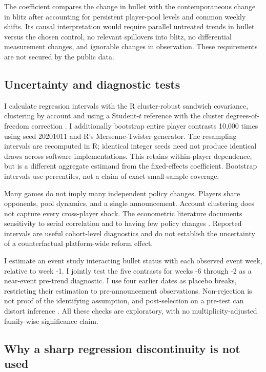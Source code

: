 \documentclass[11pt,a4paper]{article}
\begin{document}
The coefficient compares the change in bullet with the contemporaneous change in blitz after accounting for persistent player-pool levels and common weekly shifts. Its causal interpretation would require parallel untreated trends in bullet versus the chosen control, no relevant spillovers into blitz, no differential measurement changes, and ignorable changes in observation. These requirements are not secured by the public data.

\subsection{Uncertainty and diagnostic tests}

I calculate regression intervals with the R cluster-robust sandwich covariance, clustering by account and using a Student-$t$ reference with the cluster degrees-of-freedom correction \cite{rstats,zeileis}. I additionally bootstrap entire player contrasts 10,000 times using seed 20201011 and R's Mersenne-Twister generator. The resampling intervals are recomputed in R; identical integer seeds need not produce identical draws across software implementations. This retains within-player dependence, but is a different aggregate estimand from the fixed-effects coefficient. Bootstrap intervals use percentiles, not a claim of exact small-sample coverage.

Many games do not imply many independent policy changes. Players share opponents, pool dynamics, and a single announcement. Account clustering does not capture every cross-player shock. The econometric literature documents sensitivity to serial correlation and to having few policy changes \cite{bertrand,conley}. Reported intervals are useful cohort-level diagnostics and do not establish the uncertainty of a counterfactual platform-wide reform effect.

I estimate an event study interacting bullet status with each observed event week, relative to week -1. I jointly test the five contrasts for weeks -6 through -2 as a near-event pre-trend diagnostic. I use four earlier dates as placebo breaks, restricting their estimation to pre-announcement observations. Non-rejection is not proof of the identifying assumption, and post-selection on a pre-test can distort inference \cite{roth}. All these checks are exploratory, with no multiplicity-adjusted family-wise significance claim.

\subsection{Why a sharp regression discontinuity is not used}
\end{document}
